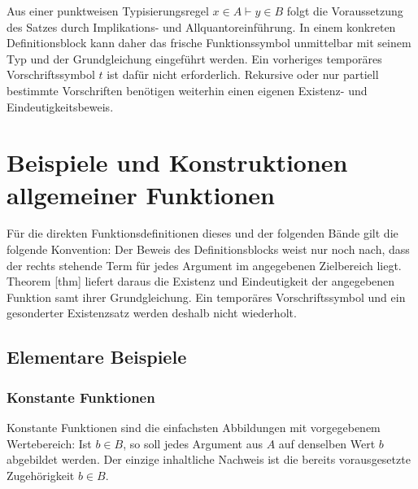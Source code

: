 \documentclass[main.tex]{subfiles}
\begin{document}
Aus einer punktweisen Typisierungsregel \(x\in A\vdash y\in B\) folgt die
Voraussetzung des Satzes durch Implikations- und Allquantoreinführung. In
einem konkreten Definitionsblock kann daher das frische Funktionssymbol
unmittelbar mit seinem Typ und der Grundgleichung eingeführt werden. Ein
vorheriges temporäres Vorschriftssymbol \(t\) ist dafür nicht erforderlich.
Rekursive oder nur partiell bestimmte Vorschriften benötigen weiterhin einen
eigenen Existenz- und Eindeutigkeitsbeweis.




\chapter{Beispiele und Konstruktionen allgemeiner Funktionen}

F\"ur die direkten Funktionsdefinitionen dieses und der folgenden B\"ande
gilt die folgende Konvention: Der Beweis des Definitionsblocks weist nur
noch nach, dass der rechts stehende Term f\"ur jedes Argument im angegebenen
Zielbereich liegt. Theorem
[thm] liefert daraus die
Existenz und Eindeutigkeit der angegebenen Funktion samt ihrer
Grundgleichung. Ein tempor\"ares Vorschriftssymbol und ein gesonderter
Existenzsatz werden deshalb nicht wiederholt.

\section{Elementare Beispiele}

\subsection{Konstante Funktionen}

Konstante Funktionen sind die einfachsten Abbildungen mit vorgegebenem
Wertebereich: Ist \(b\in B\), so soll jedes Argument aus \(A\) auf denselben
Wert \(b\) abgebildet werden. Der einzige inhaltliche Nachweis ist die
bereits vorausgesetzte Zugehörigkeit \(b\in B\).

\begin{tabproof}
\end{tabproof}
\end{document}
